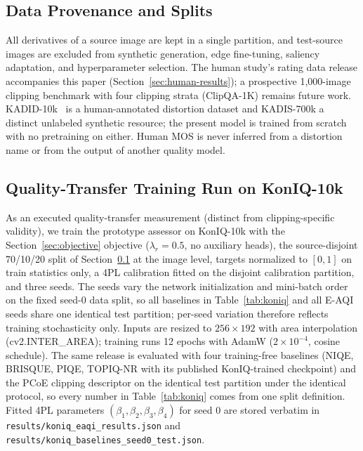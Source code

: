 \documentclass[5p,times,twocolumn]{elsarticle}
\begin{document}
\subsection{Data Provenance and Splits}
\label{sec:data}

All derivatives of a source image are kept in a single partition, and
test-source images are excluded from synthetic generation, edge fine-tuning,
saliency adaptation, and hyperparameter selection. The human study's rating
data release accompanies this paper (Section~\ref{sec:human-results}); a
prospective 1{,}000-image clipping benchmark with four clipping strata
(ClipQA-1K) remains future work.
KADID-10k~\cite{lin2019kadid10k} is a human-annotated distortion dataset and
KADIS-700k a distinct unlabeled synthetic resource; the present model is
trained from scratch with no pretraining on either. Human MOS is never
inferred from a distortion name or from the output of another quality model.

\subsection{Quality-Transfer Training Run on KonIQ-10k}
\label{sec:koniq-run}

As an executed quality-transfer measurement (distinct from
clipping-specific validity), we train the prototype assessor on KonIQ-10k
\cite{hosu2020koniq} with the Section~\ref{sec:objective} objective
($\lambda_r = 0.5$, no auxiliary heads), the source-disjoint 70/10/20
split of Section~\ref{sec:data} at the image level, targets normalized to
$[0, 1]$ on train statistics only, a 4PL calibration fitted on the disjoint
calibration partition, and three seeds. The seeds vary the network
initialization and mini-batch order on the fixed seed-0 data split, so all
baselines in Table~\ref{tab:koniq} and all E-AQI seeds share one identical
test partition; per-seed variation therefore reflects training stochasticity
only. Inputs are resized to $256 \times 192$ with area interpolation
(cv2.INTER\_AREA); training runs 12 epochs with AdamW ($2\times10^{-4}$,
cosine schedule). The same release is evaluated with four training-free
baselines (NIQE, BRISQUE, PIQE, TOPIQ-NR with its published KonIQ-trained
checkpoint) and the PCoE clipping descriptor on the identical test partition
under the identical protocol, so every number in
Table~\ref{tab:koniq} comes from one split definition. Fitted 4PL parameters
$(\beta_1, \beta_2, \beta_3, \beta_4)$ for seed 0 are stored verbatim in
\texttt{results/koniq\_eaqi\_results.json} and
\texttt{results/koniq\_baselines\_seed0\_test.json}.
\end{document}
